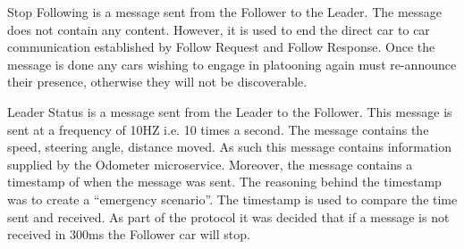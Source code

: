 \documentclass[12pt]{article}
\begin{document}
Stop Following is a message sent from the Follower to the Leader. The message does not contain any content. However, it is used to end the direct car to car communication established by Follow Request and Follow Response. Once the message is done any cars wishing to engage in platooning again must re-announce their presence, otherwise they will not be discoverable. \par

Leader Status is a message sent from the Leader to the Follower. This message is sent at a frequency of 10HZ i.e. 10 times a second. The message contains the speed, steering angle, distance moved. As such this message contains information supplied by the Odometer microservice. Moreover, the message contains a timestamp of when the message was sent. The reasoning behind the timestamp was to create a “emergency scenario”. The timestamp is used to compare the time sent and received. As part of the protocol it was decided that if a message is not received in 300ms the Follower car will stop. \par

\end{document}
